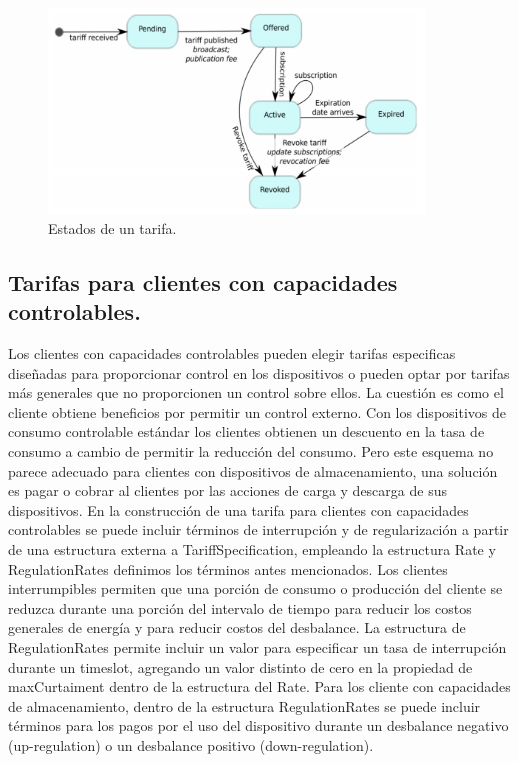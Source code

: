 \begin{figure}[h!]
	\centering
	\includegraphics[width=10cm]{img/state.png}
	\caption{Estados de un tarifa.}
	\label{state}
\end{figure}

\subsection{Tarifas para clientes con capacidades controlables.}

Los clientes con capacidades controlables pueden elegir tarifas especificas diseñadas para proporcionar control en los dispositivos o pueden optar por tarifas más generales que no proporcionen un control sobre ellos. 
La cuestión es como el cliente obtiene beneficios por permitir un control externo. 
Con los dispositivos de consumo controlable estándar los clientes obtienen un descuento en la tasa de consumo a cambio de permitir la reducción del consumo. 
Pero este esquema no parece adecuado para clientes con dispositivos de almacenamiento, una solución es pagar o cobrar al clientes por las acciones de carga y descarga de sus dispositivos. 
En la construcción de una tarifa para clientes con capacidades controlables se puede incluir términos de interrupción y de regularización a partir de una estructura externa a TariffSpecification, empleando la estructura Rate y RegulationRates definimos los términos antes mencionados. 
Los clientes interrumpibles permiten que una porción de consumo o producción del cliente se reduzca durante una porción del intervalo de tiempo para reducir los costos generales de energía y para reducir costos del desbalance. 
La estructura de RegulationRates permite incluir un valor para especificar un tasa de interrupción durante un timeslot, agregando un valor distinto de cero en la propiedad de maxCurtaiment dentro de la estructura del Rate. 
Para los cliente con capacidades de almacenamiento, dentro de la estructura RegulationRates se puede incluir términos para los pagos por el uso del dispositivo durante un desbalance negativo (up-regulation) o un desbalance positivo (down-regulation).

